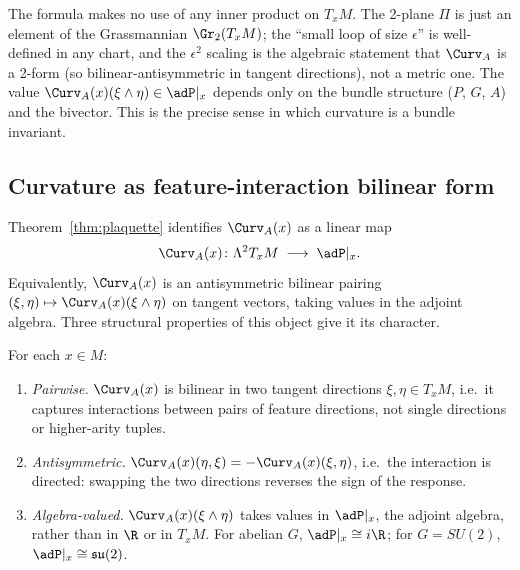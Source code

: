 \begin{remark}\label{rem:bundle-not-riemann}
The formula makes no use of any inner product on $T_xM$. The 2-plane
$\Pi$ is just an element of the Grassmannian $\Gr_2(T_xM)$; the
``small loop of size $\epsilon$'' is well-defined in any chart, and the
$\epsilon^2$ scaling is the algebraic statement that $\Curv_A$ is a
2-form (so bilinear-antisymmetric in tangent directions), not a
metric one. The value
$\Curv_A(x)(\xi\wedge\eta)\in\adP|_x$ depends only on the bundle
structure ($P$, $G$, $A$) and the bivector. This is the precise sense
in which curvature is a bundle invariant.
\end{remark}

\subsection{Curvature as feature-interaction bilinear form}\label{ssec:curvature-bilinear}

Theorem~\ref{thm:plaquette} identifies $\Curv_A(x)$ as a linear map
\[
   \Curv_A(x)\colon \Lambda^2 T_xM \;\longrightarrow\; \adP|_x.
\]
Equivalently, $\Curv_A(x)$ is an antisymmetric bilinear pairing
$(\xi,\eta)\mapsto \Curv_A(x)(\xi\wedge\eta)$ on tangent vectors,
taking values in the adjoint algebra. Three structural properties of
this object give it its character.

\begin{proposition}\label{prop:curvature-structure}
For each $x\in M$:
\begin{enumerate}[label=(\roman*),leftmargin=2em]
\item \emph{Pairwise.} $\Curv_A(x)$ is bilinear in two tangent
directions $\xi,\eta\in T_xM$, i.e.\ it captures interactions between
pairs of feature directions, not single directions or higher-arity
tuples.
\item \emph{Antisymmetric.} $\Curv_A(x)(\eta,\xi)=-\Curv_A(x)(\xi,\eta)$,
i.e.\ the interaction is directed: swapping the two directions
reverses the sign of the response.
\item \emph{Algebra-valued.} $\Curv_A(x)(\xi\wedge\eta)$ takes values
in $\adP|_x$, the adjoint algebra, rather than in $\R$ or in $T_xM$.
For abelian $G$, $\adP|_x\cong i\R$; for $G=SU(2)$, $\adP|_x\cong\mathfrak{su}(2)$.
\end{enumerate}
\end{proposition}

